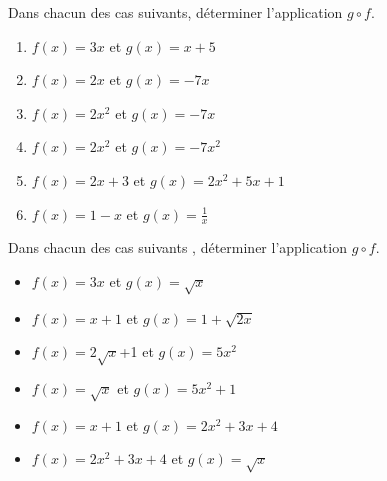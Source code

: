 



	
\begin{exercice}
Dans chacun des cas suivants, déterminer l'application  $ g\circ f $.

\begin{enumerate}[label =\alph*)]
\item  $ f(x)= 3x $ \; et\; $ g(x)=x+5 $


\item  $ f(x)= 2x $ \; et \; $ g(x)=-7x $


\item  $ f(x)= 2x^{2} $ \; et \; $ g(x)=-7x $


\item  $ f(x)= 2x^{2} $ \; et \; $ g(x)=-7x^{2} $


\item $ f(x)= 2x+3 $ \; et\; $ g(x)=2x^{2}+5x+1 $


\item $ f(x)= 1-x $ \;  et  \;$ g(x)=\frac{1}{x} $

\end{enumerate}

\end{exercice}



\begin{exercice}
 Dans chacun des cas suivants , déterminer l'application  $ g\circ f $.

\begin{itemize}
\item  $ f(x)= 3x $ \; et \;$ g(x)=\sqrt{x} $


\item  $ f(x)= x+1 $ \; et\; $ g(x)=1+\sqrt{2x} $


\item $ f(x)= 2\sqrt{x} $+1 \; et\;  $ g(x)=5x^{2} $


\item $ f(x)= \sqrt{x} $ \; et\;  $ g(x)=5x^{2}+1 $


\item $ f(x)= x+1 $\;  et  \; $ g(x)=2x^{2} +3x+4$

\item $ f(x)= 2x^{2} +3x+4 $\;  et  \; $ g(x)=\sqrt{x}$
\end{itemize}

\end{exercice}


